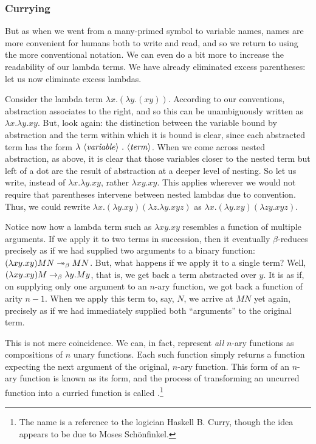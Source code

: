 \subsubsection{Currying}\label{untyped:currying}
But as when we went from a many-primed symbol to variable names, names are more convenient for humans both to write and read, and so we return to using the more conventional notation. We can even do a bit more to increase the readability of our lambda terms. We have already eliminated excess parentheses: let us now eliminate excess lambdas.

Consider the lambda term $\lambda x. (\lambda y. (xy))$. According to our conventions, abstraction associates to the right, and so this can be unambiguously written as $\lambda x. \lambda y. xy$. But, look again: the distinction between the variable bound by abstraction and the term within which it is bound is clear, since each abstracted term has the form $\lambda \text{ $\langle$\textit{variable}$\rangle$ } . \text{ $\langle$\textit{term}$\rangle$}$. When we come across nested abstraction, as above, it is clear that those variables closer to the nested term but left of a dot are the result of abstraction at a deeper level of nesting. So let us write, instead of $\lambda x. \lambda y. xy$, rather $\lambda x y . xy$. This applies wherever we would not require that parentheses intervene between nested lambdas due to convention. Thus, we could rewrite $\lambda x. (\lambda y. xy) (\lambda z. \lambda y. xyz)$ as $\lambda x. (\lambda y. xy) (\lambda zy.xyz)$.

Notice now how a lambda term such as $\lambda xy. xy$ resembles a function of multiple arguments. If we apply it to two terms in succession, then it eventually $\beta$-reduces precisely as if we had supplied two arguments to a binary function: $(\lambda xy. xy) M N \betared[*] M N$. But, what happens if we apply it to a single term? Well, $(\lambda xy. xy) M \betared \lambda y. My$, that is, we get back a term abstracted over $y$. It is as if, on supplying only one argument to an $n$-ary function, we got back a function of arity $n - 1$. When we apply this term to, say, $N$, we arrive at $M N$ yet again, precisely as if we had immediately supplied both ``arguments'' to the original term.

This is not mere coincidence. We can, in fact, represent \emph{all} $n$-ary functions as compositions of $n$ unary functions. Each such function simply returns a function expecting the next argument of the original, $n$-ary function. This form of an $n$-ary function is known as its  form, and the process of transforming an uncurred function into a curried function is called .\footnote{The name is a reference to the logician Haskell B. Curry, though the idea appears to be due to Moses Sch\"{o}nfinkel.}

